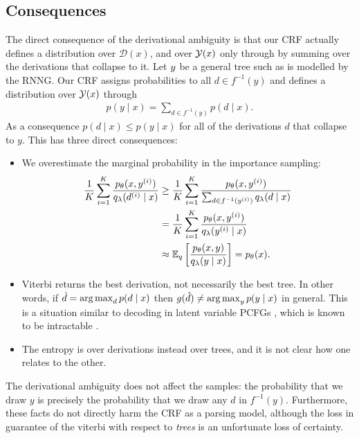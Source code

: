   \subsection{Consequences}
    The direct consequence of the derivational ambiguity is that our CRF actually defines a distribution over $\mathcal{D}(x)$, and over $\mathcal{Y}(x)$ only through by summing over the derivations that collapse to it. Let $y$ be a general tree such as is modelled by the RNNG. Our CRF assigns probabilities to all $d \in f^{-1}(y)$ and defines a distribution over $\mathcal{Y}(x)$ through
    \begin{align*}
      p(y \mid x) = \sum_{d \in f^{-1}(y)} p(d \mid x).
    \end{align*}
    As a consequence $p(d \mid x) \leq p(y \mid x)$ for all of the derivations $d$ that collapse to $y$. This has three direct consequences:
    \begin{itemize}
      \item We overestimate the marginal probability in the importance sampling:
        \begin{align*}
          \frac{1}{K}\sum_{i=1}^K  \frac{p_{\theta}( x, y^{(i)} )}{q_{\lambda}(d^{(i)} \mid x)}
            &\geq \frac{1}{K}\sum_{i=1}^K  \frac{p_{\theta}( x, y^{(i)} )}{\sum_{d \in f^{-1}(y^{(i)})} q_{\lambda}(d \mid x)}  \\
            &= \frac{1}{K}\sum_{i=1}^K  \frac{p_{\theta}( x, y^{(i)} )}{q_{\lambda}(y^{(i)} \mid x)}  \\
            &\approx \operatorname{\mathbb{E}}_{q} \bigg[\frac{p_{\theta}(x,y )}{q_{\lambda}(y \mid x)} \bigg] = p_{\theta}(x).
        \end{align*}
      \item Viterbi returns the best derivation, not necessarily the best tree. In other words, if $\hat{d} = \operatorname*{arg\,max}_d p(d \mid x)$ then $g(\hat{d}) \neq \operatorname*{arg\,max}_y p(y \mid x)$ in general. This is a situation similar to decoding in latent variable PCFGs \citep{petrov2006learning}, which is known to be intractable \citep{sima2002computational}.
      \item The entropy is over derivations instead over trees, and it is not clear how one relates to the other.
    \end{itemize}
    The derivational ambiguity does not affect the samples: the probability that we draw $y$ is precisely the probability that we draw any $d$ in $f^{-1}(y)$. Furthermore, these facts do not directly harm the CRF as a parsing model, although the loss in guarantee of the viterbi with respect to \textit{trees} is an unfortunate loss of certainty.

